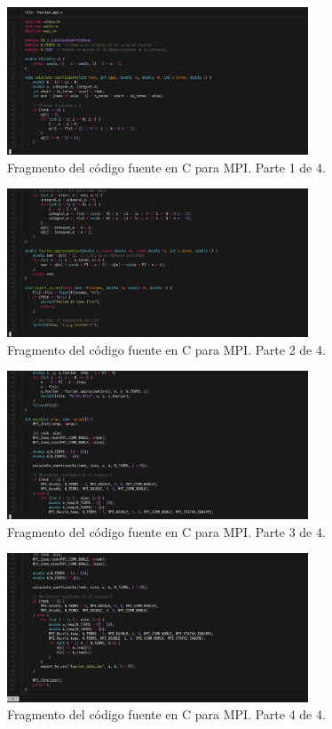 \begin{figure}[H]
	\includegraphics[width=0.8\textwidth]{media/mpi_codigo_1.png}
	\caption{Fragmento del código fuente en C para MPI. Parte 1 de 4.}
\end{figure}
\begin{figure}[H]
	\includegraphics[width=0.8\textwidth]{media/mpi_codigo_2.png}
	\caption{Fragmento del código fuente en C para MPI. Parte 2 de 4.}
\end{figure}
\begin{figure}[H]
	\includegraphics[width=0.8\textwidth]{media/mpi_codigo_3.png}
	\caption{Fragmento del código fuente en C para MPI. Parte 3 de 4.}
\end{figure}
\begin{figure}[H]
	\includegraphics[width=0.8\textwidth]{media/mpi_codigo_4.png}
	\caption{Fragmento del código fuente en C para MPI. Parte 4 de 4.}
\end{figure}